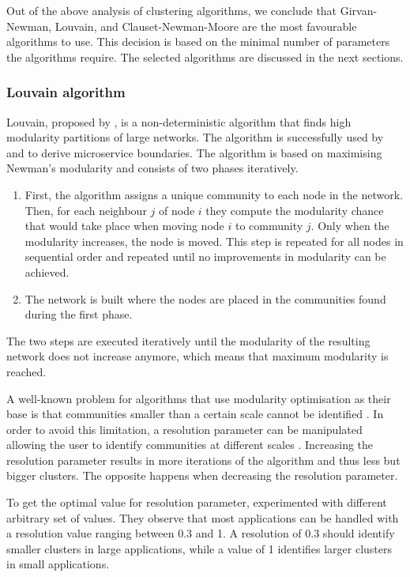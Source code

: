 Out of the above analysis of clustering algorithms, we conclude that Girvan-Newman, Louvain, and Clauset-Newman-Moore are the most favourable algorithms to use. This decision is based on the minimal number of parameters the algorithms require. The selected algorithms are discussed in the next sections. \par

\subsubsection{Louvain algorithm}
Louvain, proposed by \citeauthor{blondel2008fast} \cite{blondel2008fast}, is a non-deterministic algorithm that finds high modularity partitions of large networks. The algorithm is successfully used by \citeauthor{lohnertz2020steinmetz} \cite{lohnertz2020steinmetz} and \citeauthor{brito2021identification} \cite{brito2021identification} to derive microservice boundaries. The algorithm is based on maximising Newman's modularity \cite{newman2006modularity} and consists of two phases iteratively. 

\begin{enumerate}
    \item First, the algorithm assigns a unique community to each node in the network. Then, for each neighbour $j$ of node $i$ they compute the modularity chance that would take place when moving node $i$ to community $j$. Only when the modularity increases, the node is moved. This step is repeated for all nodes in sequential order and repeated until no improvements in modularity can be achieved.
    \item The network is built where the nodes are placed in the communities found during the first phase.
\end{enumerate}

The two steps are executed iteratively until the modularity of the resulting network does not increase anymore, which means that maximum modularity is reached. \par
A well-known problem for algorithms that use modularity optimisation as their base is that communities smaller than a certain scale cannot be identified \cite{fortunato2007resolution}. In order to avoid this limitation, a resolution parameter can be manipulated allowing the user to identify communities at different scales \cite{fortunato2007resolution}. Increasing the resolution parameter results in more iterations of the algorithm and thus less but bigger clusters. The opposite happens when decreasing the resolution parameter. \par
To get the optimal value for resolution parameter, \citeauthor{brito2021identification} \cite{brito2021identification} experimented with different arbitrary set of values. They observe that most applications can be handled with a resolution value ranging between 0.3 and 1. A resolution of 0.3 should identify smaller clusters in large applications, while a value of 1 identifies larger clusters in small applications. 

